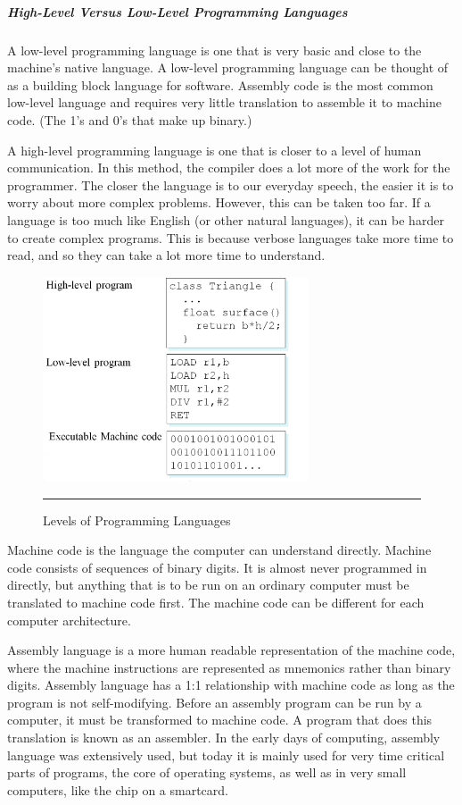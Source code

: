 \subparagraph*{High-Level Versus Low-Level Programming Languages}
\hfill \break
A low-level programming language is one that is very basic and close to the machine's native language. A low-level programming language can be thought of as a building block language for software. Assembly code is the most common low-level language and requires very little translation to assemble it to machine code. (The 1's and 0's that make up binary.)

A high-level programming language is one that is closer to a level of human communication. In this method, the compiler does a lot more of the work for the programmer. The closer the language is to our everyday speech, the easier it is to worry about more complex problems. However, this can be taken too far. If a language is too much like English (or other natural languages), it can be harder to create complex programs. This is because verbose languages take more time to read, and so they can take a lot more time to understand.\cite{14}
\begin{figure}[h!]
        \centering
                \includegraphics[width=0.7\textwidth]{./Pictures/lavels.jpg}
                  \rule{0.7\textwidth}{1pt}
        \caption{Levels of Programming Languages}
\end{figure}

Machine code is the language the computer can understand directly. Machine code consists of sequences of binary digits. It is almost never programmed in directly, but anything that is to be run on an ordinary computer must be translated to machine code first. The machine code can be different for each computer architecture.

Assembly language is a more human readable representation of the machine code, where the machine instructions are represented as mnemonics rather than binary digits. Assembly language has a 1:1 relationship with machine code as long as the program is not self-modifying. Before an assembly program can be run by a computer, it must be transformed to machine code. A program that does this translation is known as an assembler. In the early days of computing, assembly language was extensively used, but today it is mainly used for very time critical parts of programs, the core of operating systems, as well as in very small computers, like the chip on a smartcard.

